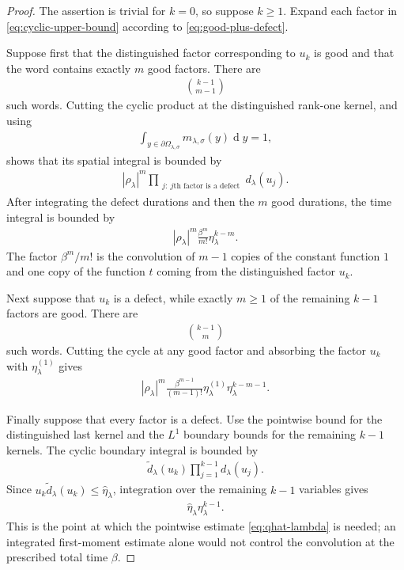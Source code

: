 \documentclass[a4paper,10pt]{article}
\numberwithin{equation}{section}
\theoremstyle{plain}
\theoremstyle{plain}
\theoremstyle{plain}
\theoremstyle{plain}
\theoremstyle{plain}
\theoremstyle{remark}
\theoremstyle{definition}
\newcommand{\dif}{\operatorname{d}\!} %
\newcommand{\abs}[1]{\left\lvert#1\right\rvert}
\newcommand{\eq}[1]{\begin{align*}#1\end{align*}}
\newcommand{\eql}[1]{\begin{align}#1\end{align}}
\begin{document}
\begin{proof}
The assertion is trivial for $k=0$, so suppose $k\geq1$. Expand each factor in \cref{eq:cyclic-upper-bound} according to \cref{eq:good-plus-defect}.

Suppose first that the distinguished factor corresponding to $u_k$ is good and that the word contains exactly $m$ good factors. There are
\eq{
\binom{k-1}{m-1}
}
such words. Cutting the cyclic product at the distinguished rank-one kernel, and using
\eq{
\int_{y\in\partial\Omega_{\lambda,\sigma}}m_{\lambda,\sigma}(y)\dif{y}=1,
}
shows that its spatial integral is bounded by
\eq{
\abs{\rho_\lambda}^m
\prod_{\substack{j:\ \text{$j$th factor is a defect}}}
d_\lambda(u_j).
}
After integrating the defect durations and then the $m$ good durations, the time integral is bounded by
\eql{
\abs{\rho_\lambda}^m
\frac{\beta^m}{m!}
\eta_\lambda^{k-m}.
\label{eq:word-bound-distinguished-good}
}
The factor $\beta^m/m!$ is the convolution of $m-1$ copies of the constant function $1$ and one copy of the function $t$ coming from the distinguished factor $u_k$.

Next suppose that $u_k$ is a defect, while exactly $m\geq1$ of the remaining $k-1$ factors are good. There are
\eq{
\binom{k-1}{m}
}
such words. Cutting the cycle at any good factor and absorbing the factor $u_k$ with $\eta_\lambda^{(1)}$ gives
\eql{
\abs{\rho_\lambda}^m
\frac{\beta^{m-1}}{(m-1)!}
\eta_\lambda^{(1)}
\eta_\lambda^{k-m-1}.
\label{eq:word-bound-distinguished-defect}
}

Finally suppose that every factor is a defect. Use the pointwise bound for the distinguished last kernel and the $L^1$ boundary bounds for the remaining $k-1$ kernels. The cyclic boundary integral is bounded by
\eq{
\widetilde d_\lambda(u_k)
\prod_{j=1}^{k-1}d_\lambda(u_j).
}
Since $u_k\widetilde d_\lambda(u_k)\leq\widehat\eta_\lambda$, integration over the remaining $k-1$ variables gives
\eql{
\widehat\eta_\lambda \eta_\lambda^{k-1}.
\label{eq:all-defect-bound}
}
This is the point at which the pointwise estimate \cref{eq:qhat-lambda} is needed; an integrated first-moment estimate alone would not control the convolution at the prescribed total time $\beta$.


\end{proof}
\end{document}
